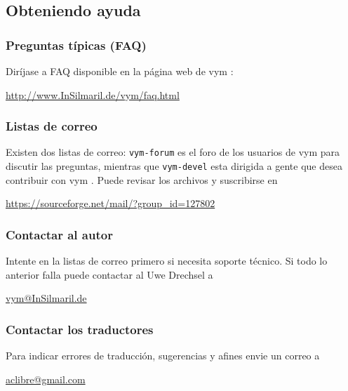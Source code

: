\documentclass{article}
\newcommand{\vym}{{\sc vym }}
\begin{document}
\begin{appendix}
\subsection{Obteniendo ayuda}

\subsubsection*{Preguntas t\'ipicas (FAQ)}
Dir\'ijase a FAQ disponible en la p\'agina web de \vym:
\begin{center}
\href{http://www.InSilmaril.de/vym/faq.html}{http://www.InSilmaril.de/vym/faq.html}
\end{center}

\subsubsection*{Listas de correo}
Existen dos listas de correo: {\tt vym-forum} es el foro de los usuarios de \vym para discutir las preguntas, mientras que {\tt vym-devel} esta dirigida a gente que desea contribuir con \vym. Puede revisar los archivos y suscribirse en
\begin{center}
\href{https://sourceforge.net/mail/?group_id=127802}{https://sourceforge.net/mail/?group\_id=127802}
\end{center}

\subsubsection*{Contactar al autor}\label{author}
Intente en la listas de correo primero si necesita soporte t\'ecnico. Si todo lo anterior falla puede contactar al Uwe Drechsel a
\begin{center}
\href{mailto:vym@InSilmaril.de}{vym@InSilmaril.de}
\end{center}

\subsubsection*{Contactar los traductores}\label{author}
Para indicar errores de traducci\'on, sugerencias y afines envie un correo a
\begin{center}
\href{mailto:aclibre@gmail.com}{aclibre@gmail.com}
\end{center}




\end{appendix}
\end{document}
